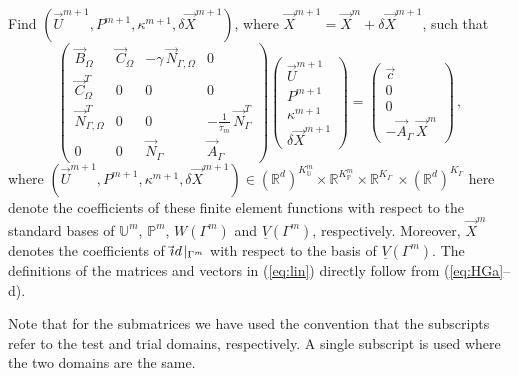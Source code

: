 \documentclass[a4paper,11pt,onecolumn]{article}
\newcommand{\R}{{\mathbb R}}
\newcommand{\Vh}{\underline{V}(\Gamma^m)}
\newcommand{\Wh}{W(\Gamma^m)}
\newcommand{\uspace}{\mathbb{U}}
\newcommand{\pspace}{\mathbb{P}}
\newcommand{\id}{\rm id}
\newcommand{\NbulkT}{\vec{N}_{\Gamma,\Omega}^T}
\newcommand{\Nbulk}{\vec{N}_{\Gamma,\Omega}}
\begin{document}
Find $(\vec U^{m+1},P^{m+1}, \kappa^{m+1},\delta\vec{X}^{m+1})$, where $\vec
X^{m+1} = \vec X^m+ \delta\vec X^{m+1}$, such that
\begin{equation}
\begin{pmatrix}
\vec B_\Omega & \vec C_\Omega & -\gamma\,\Nbulk & 0 \\
\vec C^T_\Omega & 0 & 0 & 0 \\
\NbulkT & 0 & 0 & -\frac1{\tau_m}\,\vec{N}_\Gamma^T \\
0 & 0 & \vec{N}_\Gamma & \vec{A}_\Gamma
\end{pmatrix}
\begin{pmatrix}
\vec U^{m+1} \\
P^{m+1} \\
\kappa^{m+1} \\
\delta\vec{X}^{m+1}
\end{pmatrix}
=
\begin{pmatrix}
\vec c \\
0 \\
0 \\
-\vec{A}_\Gamma\,\vec X^m
\end{pmatrix} \,,
\label{eq:lin}
\end{equation}
where $(\vec U^{m+1},P^{m+1},\kappa^{m+1},\delta\vec{X}^{m+1})\in
(\R^d)^{K^m_\uspace}\times \R^{K^m_\pspace} \times \R^{K_\Gamma}\,\times
(\R^d)^{K_\Gamma}$ here denote the coefficients of these finite element
functions with respect to the standard bases of $\uspace^m$, $\pspace^m$, $\Wh$
and $\Vh$, respectively. Moreover, $\vec X^m$ denotes the coefficients of
$\vec\id\!\mid_{\Gamma^m}$ with respect to the basis of $\Vh$. The definitions
of the matrices and vectors in (\ref{eq:lin}) directly follow from
(\ref{eq:HGa}--d).

Note that for the submatrices we have used the convention that the subscripts
refer to the test and trial domains, respectively. A single subscript is
used where the two domains are the same.
\end{document}
